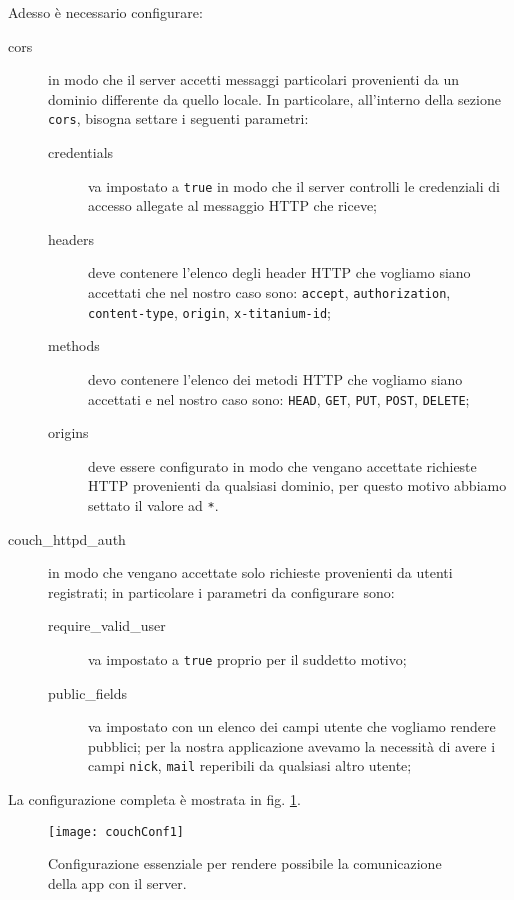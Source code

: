         \noindent Adesso è necessario configurare:
        \begin{description}
            \item[cors] in modo che il server accetti messaggi \html{} 
            particolari provenienti da un dominio differente da quello locale. 
            In particolare, all'interno della sezione \texttt{cors}, bisogna 
            settare i seguenti parametri:
            \begin{description}
                \item[credentials] va impostato a \texttt{true} in modo che il 
                server controlli le credenziali di accesso allegate al 
                messaggio HTTP che riceve;
                \item[headers] deve contenere l'elenco degli header HTTP che 
                vogliamo siano accettati che nel nostro caso sono: 
                \texttt{accept}, \texttt{authorization},\\
                \texttt{content-type}, \texttt{origin}, \texttt{x-titanium-id};
                \item[methods] devo contenere l'elenco dei metodi HTTP che 
                vogliamo siano accettati e nel nostro caso sono: \texttt{HEAD}, 
                \texttt{GET}, \texttt{PUT}, \texttt{POST}, \texttt{DELETE};
                \item[origins] deve essere configurato in modo che vengano 
                accettate richieste HTTP provenienti da qualsiasi dominio, per 
                questo motivo abbiamo settato il valore ad \texttt{*}.
            \end{description}
            \item[couch\_httpd\_auth] in modo che vengano accettate solo richieste 
            provenienti da utenti registrati; in particolare i parametri da 
            configurare sono:
                \begin{description}
                    \item[require\_valid\_user] va impostato a \texttt{true} 
                    proprio per il suddetto motivo;
                    \item[public\_fields] va impostato con un elenco dei campi 
                    utente che vogliamo rendere pubblici; per la nostra 
                    applicazione avevamo la necessità di avere i campi 
                    \texttt{nick}, \texttt{mail} reperibili da qualsiasi altro utente;
                \end{description}
        \end{description}
        La configurazione completa è mostrata in fig. \ref{fig:confCouch1}.
        \begin{figure}[H]
            \centering
            \texttt{[image: couchConf1]}
            \caption{
                Configurazione essenziale per rendere possibile la comunicazione
                della app con il server.
            }
            \label{fig:confCouch1}
        \end{figure}


